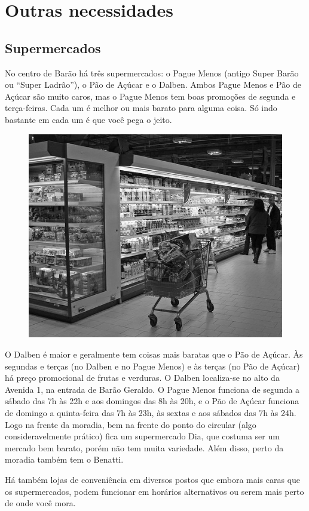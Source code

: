 
\section{Outras necessidades}
\subsection{Supermercados}

No centro de Barão há três supermercados: o Pague Menos (antigo Super Barão ou
``Super Ladrão''), o Pão de Açúcar e o Dalben. Ambos Pague Menos e Pão de Açúcar
são muito caros, mas o Pague Menos tem boas promoções de segunda e terça-feiras.
Cada um é melhor ou mais barato para alguma coisa. Só indo bastante em cada um é
que você pega o jeito.

\begin{figure}[h!]
    \centering
    \includegraphics[width=.45\textwidth]{img/barao/supermercado.jpg}
\end{figure}

O Dalben é maior e geralmente tem coisas mais baratas que o Pão de Açúcar. Às
segundas e terças (no Dalben e no Pague Menos) e às terças (no Pão de Açúcar) há
preço promocional de frutas e verduras. O Dalben localiza-se no alto da Avenida
1, na entrada de Barão Geraldo. O Pague Menos funciona de segunda a sábado das
7h às 22h e aos domingos das 8h às 20h, e o Pão de Açúcar funciona de domingo a
quinta-feira das 7h às 23h, às sextas e aos sábados das 7h às 24h. Logo na
frente da moradia, bem na frente do ponto do circular (algo consideravelmente
prático) fica um supermercado Dia, que costuma ser um mercado bem barato, porém
não tem muita variedade. Além disso, perto da moradia também tem o Benatti.

Há também lojas de conveniência em diversos postos que embora mais caras que os
supermercados, podem funcionar em horários alternativos ou serem mais perto de
onde você mora.

